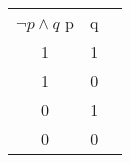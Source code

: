 \documentclass{article}
\begin{document}
\begin{tabular}{|c|c|c|}
$\neg p\land q$
\hline
p & q \\
1 & 1 \\
1 & 0 \\
0 & 1 \\
0 & 0 \\
\hline

\end{tabular}
\end{document}
